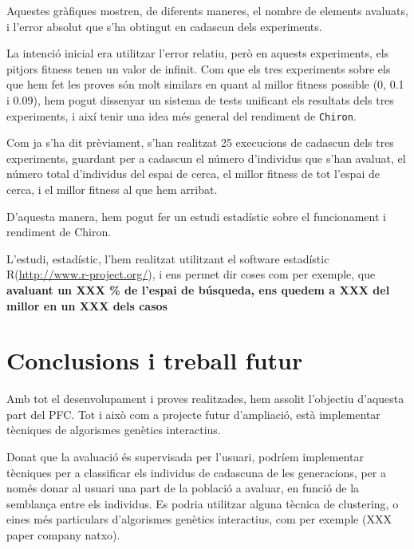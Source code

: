 	Aquestes gràfiques mostren, de diferents maneres, el nombre de elements
	avaluats, i l'error absolut que s'ha obtingut en cadascun dels experiments.

	La intenció inicial era utilitzar l'error relatiu, però en aquests
	experiments, els pitjors fitness tenen un valor de infinit.  Com que els
	tres experiments sobre els que hem fet les proves són molt similars en quant
	al millor fitness possible (0, 0.1 i 0.09), hem pogut dissenyar un
	sistema de tests unificant els resultats dels tres experiments, i així tenir
	una idea més general del rendiment de \texttt{Chiron}.

	Com ja s'ha dit prèviament, s'han  realitzat 25 execucions de cadascun dels
	tres experiments, guardant per a cadascun el número d'individus que s'han
	avaluat, el número total d'individus del espai de cerca, el millor fitness
	de tot l'espai de cerca, i el millor fitness al que hem arribat.

	D'aquesta manera, hem pogut fer un estudi estadístic sobre el funcionament i
	rendiment de Chiron.

	L'estudi, estadístic, l'hem realitzat utilitzant el software estadístic
	R(\url{http://www.r-project.org/}), i ens permet dir coses com per exemple, que \textbf{avaluant un XXX
	\% de l'espai de búsqueda, ens quedem a XXX del millor en un XXX dels casos}


\section{Conclusions i treball futur} %
\label{sec:CConclusions i treball futur}

	Amb tot el desenvolupament i proves realitzades, hem assolit l'objectiu
	d'aquesta part del PFC.  Tot i això com a projecte futur
	d'ampliació, està implementar tècniques de algorismes genètics interactius.

	Donat que la avaluació és supervisada per l'usuari, podríem implementar
	tècniques per a classificar els individus de cadascuna de les generacions,
	per a només donar al usuari una part de la població a avaluar, en funció de
	la semblança entre els individus.  Es podria utilitzar alguna tècnica de
	clustering, o eines més particulars d'algorismes genètics interactius, com
	per exemple (XXX paper company natxo).

%
